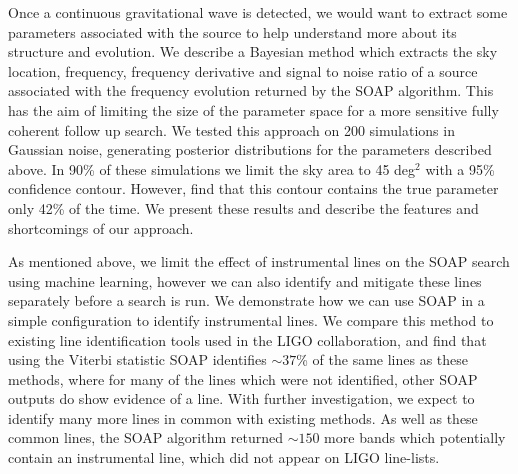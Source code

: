 Once a continuous gravitational wave is detected, we would want to extract some
parameters associated with the source to help understand more about its
structure and evolution. We describe a Bayesian method which extracts the sky
location, frequency, frequency derivative and signal to noise ratio of a source associated with the
frequency evolution returned by the SOAP algorithm.  This has the aim of
limiting the size of the parameter space for a more sensitive fully coherent
follow up search.  
We tested this approach on 200 simulations in Gaussian noise, generating posterior distributions for the parameters described above. 
In 90\% of these simulations we limit the sky area to 45 deg$^2$ with a 95\% confidence contour.
However, find that this contour contains the true parameter only 42\% of the time.
We present these results and describe the features and shortcomings of our approach.


As mentioned above, we limit the effect of instrumental lines on the SOAP
search using machine learning, however we can also identify and mitigate these
lines separately before a search is run.  We demonstrate how we can use SOAP in
a simple configuration to identify instrumental lines.  We compare this method
to existing line identification tools used in the \gls{LIGO} collaboration, and
find that using the Viterbi statistic SOAP identifies $\sim 37$\% of the same lines as these methods, where for many of the lines which were not identified, other SOAP outputs do show evidence of a line.
With further investigation, we expect to identify many more lines in common with existing methods.
As well as these common lines, the SOAP algorithm returned $\sim 150$ more bands which potentially contain an instrumental line, which did not appear on \gls{LIGO} line-lists.









